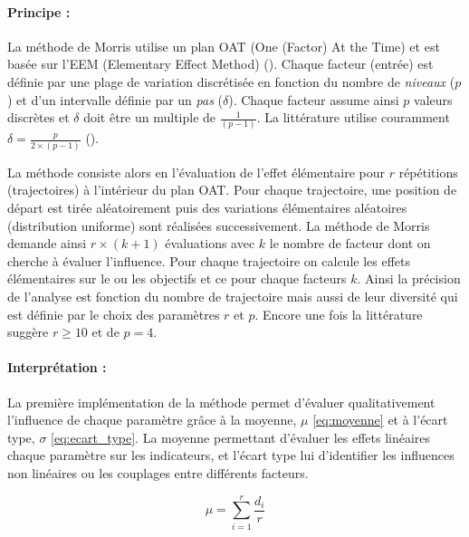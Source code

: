 \paragraph{Principe :} %
\label{par:principe}
La méthode de Morris utilise un plan OAT (One (Factor) At the Time) et est basée sur
l’EEM (Elementary Effect Method) (\cite{Saltelli2004}).
Chaque facteur (entrée) est définie par une plage de variation discrétisée en fonction
du nombre de \emph{niveaux} ($p$) et d’un intervalle définie par un \emph{pas} ($\delta$).
Chaque facteur assume ainsi $p$ valeurs discrètes et $\delta$ doit être un multiple de
$\frac{1}{(p - 1)}$. La littérature utilise couramment $\delta = \frac{p}{2 \times (p - 1)}$
(\cite{Morris1991161, Campolongo20071509}).

La méthode consiste alors en l’évaluation de l’effet élémentaire pour $r$ répétitions
(trajectoires) à l’intérieur du plan OAT. Pour chaque trajectoire, une position de départ
est tirée aléatoirement puis des variations élémentaires aléatoires (distribution uniforme)
sont réalisées successivement. La méthode de Morris demande ainsi $r \times (k + 1)$ évaluations
avec $k$ le nombre de facteur dont on cherche à évaluer l’influence. Pour chaque trajectoire
on calcule les effets élémentaires sur le ou les objectifs et ce pour chaque facteurs $k$.
Ainsi la précision de l’analyse est fonction du nombre de trajectoire mais aussi
de leur diversité qui est définie par le choix des paramètres $r$ et $p$.
Encore une fois la littérature suggère $r \geq 10$ et de $p = 4$.



\paragraph{Interprétation :} %
\label{par:interpretation}
La première implémentation de la méthode permet d’évaluer qualitativement l’influence de chaque
paramètre grâce à la moyenne, $\mu$ \eqref{eq:moyenne} et à l’écart type, $\sigma$ \eqref{eq:ecart_type}.
La moyenne permettant d’évaluer les effets linéaires chaque paramètre sur les indicateurs,
et l’écart type lui d’identifier les influences non linéaires ou les couplages entre différents facteurs.

\begin{equation}\label{eq:moyenne}
    \mu = \sum_{i = 1}^{r} \frac{d_{i}}{r}
\end{equation}

